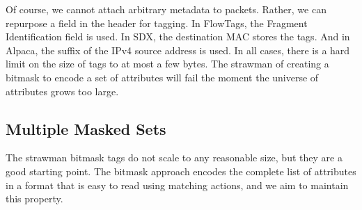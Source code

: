 Of course, we cannot attach arbitrary metadata to packets. Rather, we can
repurpose a field in the header for tagging. In FlowTags, the Fragment
Identification field is used. In SDX, the destination MAC stores the tags. And in Alpaca,
the suffix of the IPv4 source address is used. In
all cases, there is a hard limit on the size of tags to at most a few bytes.
The strawman of creating a bitmask to encode a set of attributes will fail the
moment the universe of attributes grows too large.


\subsection{Multiple Masked Sets}
\label{ssec:mset}

The strawman bitmask tags do not scale to any reasonable size, but they are 
a good starting point. The bitmask approach encodes the complete list
of attributes in a format that is easy to read using matching actions, and we aim to
maintain this property.
 


